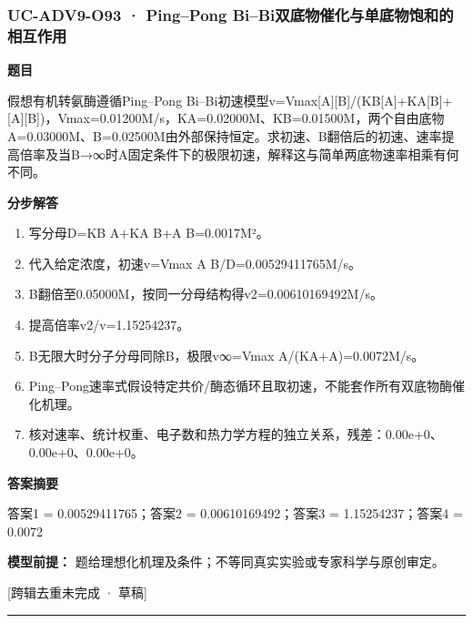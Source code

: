 \documentclass[UTF8,11pt,a4paper]{ctexart}
\begin{document}
\subsubsection*{UC-ADV9-O93 · Ping–Pong Bi–Bi双底物催化与单底物饱和的相互作用}
\noindent\textbf{题目}\par
假想有机转氨酶遵循Ping–Pong Bi–Bi初速模型v=Vmax[A][B]/(KB[A]+KA[B]+[A][B])，Vmax=0.01200M/s，KA=0.02000M、KB=0.01500M，两个自由底物A=0.03000M、B=0.02500M由外部保持恒定。求初速、B翻倍后的初速、速率提高倍率及当B→∞时A固定条件下的极限初速，解释这与简单两底物速率相乘有何不同。\par
\medskip\noindent\textbf{分步解答}
\begin{enumerate}
\item 写分母D=KB A+KA B+A B=0.0017M²。
\item 代入给定浓度，初速v=Vmax A B/D=0.00529411765M/s。
\item B翻倍至0.05000M，按同一分母结构得v2=0.00610169492M/s。
\item 提高倍率v2/v=1.15254237。
\item B无限大时分子分母同除B，极限v∞=Vmax A/(KA+A)=0.0072M/s。
\item Ping–Pong速率式假设特定共价/酶态循环且取初速，不能套作所有双底物酶催化机理。
\item 核对速率、统计权重、电子数和热力学方程的独立关系，残差：0.00e+0、0.00e+0、0.00e+0。
\end{enumerate}
\noindent\textbf{答案摘要}\par
答案1 = 0.00529411765；答案2 = 0.00610169492；答案3 = 1.15254237；答案4 = 0.0072\par
\noindent\textbf{模型前提：}
题给理想化机理及条件；不等同真实实验或专家科学与原创审定。\par
\noindent\textcolor{red!65!black}{[跨辑去重未完成 · 草稿]} \par
\medskip\hrule\medskip
{}
\end{document}
